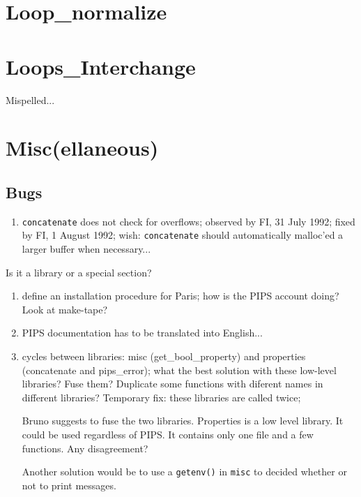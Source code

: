 \section{Loop\_normalize}

\section{Loops\_Interchange}

Mispelled...

\section{Misc(ellaneous)}

\subsection{Bugs}

\begin{enumerate}

  \item \verb+concatenate+ does not check for overflows; observed by FI,
        31 July 1992; fixed by FI, 1 August 1992; wish: \verb+concatenate+
        should automatically malloc'ed a larger buffer when necessary...

\end{enumerate}

Is it a library or a special section?

\begin{enumerate}

  \item define an installation procedure for Paris; how is the PIPS account
        doing? Look at make-tape?

  \item PIPS documentation has to be translated into English...

  \item cycles between libraries: misc (get\_bool\_property) and properties
        (concatenate and pips\_error); what the best solution with these
        low-level libraries? Fuse them? Duplicate some functions with
        diferent names in different libraries? Temporary fix: these libraries
        are called twice;

        Bruno suggests to fuse the two libraries. Properties is a low level
        library. It could be used regardless of PIPS. It contains only
        one file and a few functions. Any disagreement?

        Another solution would be to use a \verb+getenv()+ in \verb+misc+
        to decided whether or not to print messages.

\end{enumerate}

